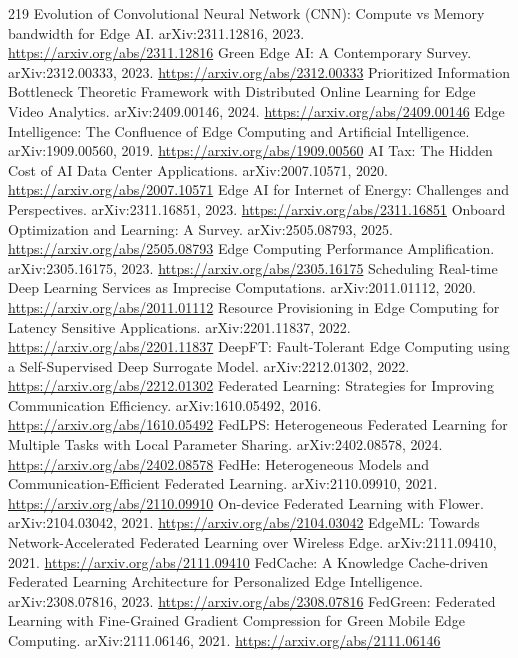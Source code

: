 \documentclass[11pt]{article}
\begin{document}
\begin{thebibliography}{219}
 Evolution of Convolutional Neural Network (CNN): Compute vs Memory bandwidth for Edge AI. arXiv:2311.12816, 2023. \url{https://arxiv.org/abs/2311.12816}
 Green Edge AI: A Contemporary Survey. arXiv:2312.00333, 2023. \url{https://arxiv.org/abs/2312.00333}
 Prioritized Information Bottleneck Theoretic Framework with Distributed Online Learning for Edge Video Analytics. arXiv:2409.00146, 2024. \url{https://arxiv.org/abs/2409.00146}
 Edge Intelligence: The Confluence of Edge Computing and Artificial Intelligence. arXiv:1909.00560, 2019. \url{https://arxiv.org/abs/1909.00560}
 AI Tax: The Hidden Cost of AI Data Center Applications. arXiv:2007.10571, 2020. \url{https://arxiv.org/abs/2007.10571}
 Edge AI for Internet of Energy: Challenges and Perspectives. arXiv:2311.16851, 2023. \url{https://arxiv.org/abs/2311.16851}
 Onboard Optimization and Learning: A Survey. arXiv:2505.08793, 2025. \url{https://arxiv.org/abs/2505.08793}
 Edge Computing Performance Amplification. arXiv:2305.16175, 2023. \url{https://arxiv.org/abs/2305.16175}
 Scheduling Real-time Deep Learning Services as Imprecise Computations. arXiv:2011.01112, 2020. \url{https://arxiv.org/abs/2011.01112}
 Resource Provisioning in Edge Computing for Latency Sensitive Applications. arXiv:2201.11837, 2022. \url{https://arxiv.org/abs/2201.11837}
 DeepFT: Fault-Tolerant Edge Computing using a Self-Supervised Deep Surrogate Model. arXiv:2212.01302, 2022. \url{https://arxiv.org/abs/2212.01302}
 Federated Learning: Strategies for Improving Communication Efficiency. arXiv:1610.05492, 2016. \url{https://arxiv.org/abs/1610.05492}
 FedLPS: Heterogeneous Federated Learning for Multiple Tasks with Local Parameter Sharing. arXiv:2402.08578, 2024. \url{https://arxiv.org/abs/2402.08578}
 FedHe: Heterogeneous Models and Communication-Efficient Federated Learning. arXiv:2110.09910, 2021. \url{https://arxiv.org/abs/2110.09910}
 On-device Federated Learning with Flower. arXiv:2104.03042, 2021. \url{https://arxiv.org/abs/2104.03042}
 EdgeML: Towards Network-Accelerated Federated Learning over Wireless Edge. arXiv:2111.09410, 2021. \url{https://arxiv.org/abs/2111.09410}
 FedCache: A Knowledge Cache-driven Federated Learning Architecture for Personalized Edge Intelligence. arXiv:2308.07816, 2023. \url{https://arxiv.org/abs/2308.07816}
 FedGreen: Federated Learning with Fine-Grained Gradient Compression for Green Mobile Edge Computing. arXiv:2111.06146, 2021. \url{https://arxiv.org/abs/2111.06146}

\end{thebibliography}
\end{document}
